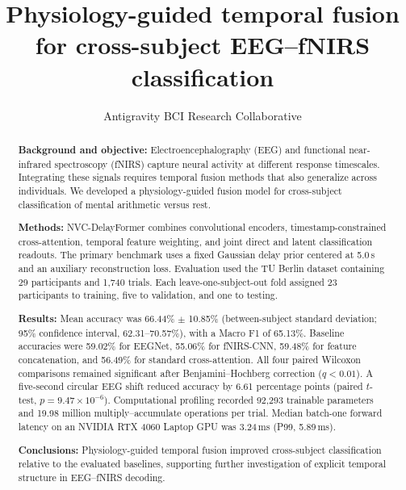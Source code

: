 \documentclass[final,5p,times,twocolumn]{elsarticle}
\begin{document}
\begin{frontmatter}

\title{Physiology-guided temporal fusion for cross-subject EEG--fNIRS classification}

\author[inst1]{Antigravity BCI Research Collaborative}


\begin{abstract}
\textbf{Background and objective:} Electroencephalography (EEG) and functional near-infrared spectroscopy (fNIRS) capture neural activity at different response timescales. Integrating these signals requires temporal fusion methods that also generalize across individuals. We developed a physiology-guided fusion model for cross-subject classification of mental arithmetic versus rest.

\textbf{Methods:} NVC-DelayFormer combines convolutional encoders, timestamp-constrained cross-attention, temporal feature weighting, and joint direct and latent classification readouts. The primary benchmark uses a fixed Gaussian delay prior centered at 5.0\,s and an auxiliary reconstruction loss. Evaluation used the TU Berlin dataset containing 29 participants and 1,740 trials. Each leave-one-subject-out fold assigned 23 participants to training, five to validation, and one to testing.

\textbf{Results:} Mean accuracy was 66.44\% $\pm$ 10.85\% (between-subject standard deviation; 95\% confidence interval, 62.31--70.57\%), with a Macro F1 of 65.13\%. Baseline accuracies were 59.02\% for EEGNet, 55.06\% for fNIRS-CNN, 59.48\% for feature concatenation, and 56.49\% for standard cross-attention. All four paired Wilcoxon comparisons remained significant after Benjamini--Hochberg correction ($q<0.01$). A five-second circular EEG shift reduced accuracy by 6.61 percentage points (paired $t$-test, $p=9.47\times10^{-6}$). Computational profiling recorded 92,293 trainable parameters and 19.98 million multiply--accumulate operations per trial. Median batch-one forward latency on an NVIDIA RTX 4060 Laptop GPU was 3.24\,ms (P99, 5.89\,ms).

\textbf{Conclusions:} Physiology-guided temporal fusion improved cross-subject classification relative to the evaluated baselines, supporting further investigation of explicit temporal structure in EEG--fNIRS decoding.
\end{abstract}


\end{frontmatter}
\end{document}
